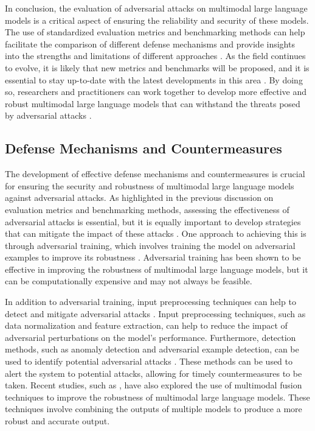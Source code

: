 \documentclass[11pt,a4paper]{article}
\begin{document}
In conclusion, the evaluation of adversarial attacks on multimodal large language models is a critical aspect of ensuring the reliability and security of these models. The use of standardized evaluation metrics and benchmarking methods can help facilitate the comparison of different defense mechanisms and provide insights into the strengths and limitations of different approaches \cite{arxiv:2401.11943}. As the field continues to evolve, it is likely that new metrics and benchmarks will be proposed, and it is essential to stay up-to-date with the latest developments in this area \cite{arxiv:2508.05602}. By doing so, researchers and practitioners can work together to develop more effective and robust multimodal large language models that can withstand the threats posed by adversarial attacks \cite{arxiv:2502.11453}.


\subsection{Defense Mechanisms and Countermeasures}


The development of effective defense mechanisms and countermeasures is crucial for ensuring the security and robustness of multimodal large language models against adversarial attacks. As highlighted in the previous discussion on evaluation metrics and benchmarking methods, assessing the effectiveness of adversarial attacks is essential, but it is equally important to develop strategies that can mitigate the impact of these attacks \cite{arxiv:2408.08632}. One approach to achieving this is through adversarial training, which involves training the model on adversarial examples to improve its robustness \cite{doi:10.1007/s11633-022-1410-8}. Adversarial training has been shown to be effective in improving the robustness of multimodal large language models, but it can be computationally expensive and may not always be feasible.

In addition to adversarial training, input preprocessing techniques can help to detect and mitigate adversarial attacks \cite{doi:10.1109/bigdata59044.2023.10386743}. Input preprocessing techniques, such as data normalization and feature extraction, can help to reduce the impact of adversarial perturbations on the model's performance. Furthermore, detection methods, such as anomaly detection and adversarial example detection, can be used to identify potential adversarial attacks \cite{arxiv:2408.15769}. These methods can be used to alert the system to potential attacks, allowing for timely countermeasures to be taken. Recent studies, such as \cite{arxiv:2401.13601}, have also explored the use of multimodal fusion techniques to improve the robustness of multimodal large language models. These techniques involve combining the outputs of multiple models to produce a more robust and accurate output.
\end{document}
